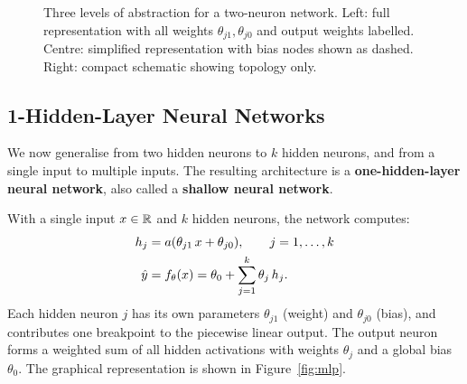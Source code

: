 \begin{figure}[h]
 \centering
 \begin{minipage}{0.32\textwidth}
 \centering
 \resizebox{\textwidth}{!}{}
 \end{minipage}
 \hfill
 \begin{minipage}{0.32\textwidth}
 \centering
 \resizebox{\textwidth}{!}{}
 \end{minipage}
 \hfill
 \begin{minipage}{0.32\textwidth}
 \centering
 \resizebox{\textwidth}{!}{}
 \end{minipage}
 \caption{Three levels of abstraction for a two-neuron network. Left: full representation with all weights $\theta_{j1}, \theta_{j0}$ and output weights labelled. Centre: simplified representation with bias nodes shown as dashed. Right: compact schematic showing topology only.}
 \label{fig:relu_combination_diagram}
\end{figure}

\subsection{1-Hidden-Layer Neural Networks}

We now generalise from two hidden neurons to $k$ hidden neurons, and from a single input to multiple inputs. The resulting architecture is a \textbf{one-hidden-layer neural network}, also called a \textbf{shallow neural network}.

With a single input $x \in \mathbb{R}$ and $k$ hidden neurons, the network computes:
\begin{align}
 h_j &= a(\theta_{j1} \, x + \theta_{j0}), \qquad j = 1, \ldots, k \\
 \hat{y} &= f_\theta(x) = \theta_0 + \sum_{j=1}^{k} \theta_j \, h_j.
\end{align}
Each hidden neuron $j$ has its own parameters $\theta_{j1}$ (weight) and $\theta_{j0}$ (bias), and contributes one breakpoint to the piecewise linear output. The output neuron forms a weighted sum of all hidden activations with weights $\theta_j$ and a global bias $\theta_0$. The graphical representation is shown in Figure~\ref{fig:mlp}.


